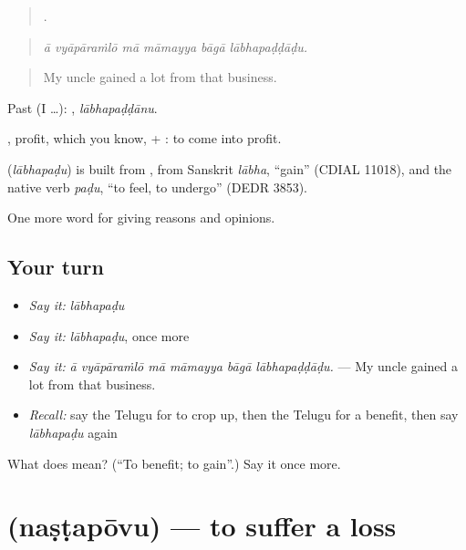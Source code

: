 \begin{quote}
     .
\end{quote}

\begin{quote}
\emph{ā vyāpāraṁlō mā māmayya bāgā lābhapaḍḍāḍu.}
\end{quote}

\begin{quote}
My uncle gained a lot from that business.
\end{quote}

Past (I …): , \emph{lābhapaḍḍānu}.

, profit, which you know, + : to come into profit.

\begin{cousinweb}
\textbf{} (\emph{lābhapaḍu}) is built from , from Sanskrit \emph{lābha}, \textquotedblleft{}gain\textquotedblright{} (CDIAL 11018), and the native verb \emph{paḍu}, \textquotedblleft{}to feel, to undergo\textquotedblright{} (DEDR 3853).
\end{cousinweb}

\begin{grammarlens}[title={What you've built}]
One more word for giving reasons and opinions.
\end{grammarlens}

\subsection*{Your turn}
\begin{itemize}
\raggedright
  \item \emph{Say it:} \emph{lābhapaḍu}
  \item \emph{Say it:} \emph{lābhapaḍu}, once more
  \item \emph{Say it:} \emph{ā vyāpāraṁlō mā māmayya bāgā lābhapaḍḍāḍu.} — My uncle gained a lot from that business.
  \item \emph{Recall:} say the Telugu for to crop up, then the Telugu for a benefit, then say \emph{lābhapaḍu} again
\end{itemize}

\begin{tcolorbox}[breakable,colback=teal!4,colframe=teal!35!black,title={Before you move on}]
What does  mean? (\textquotedblleft{}To benefit; to gain\textquotedblright{}.) Say it once more.
\end{tcolorbox}
\section[\texorpdfstring{\te{నష్టపోవు} (naṣṭapōvu)}{నష్టపోవు (naṣṭapōvu)}]{ (naṣṭapōvu) — to suffer a loss}


